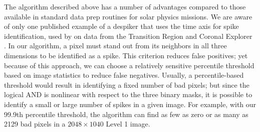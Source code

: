 The algorithm described above has a number of advantages compared to those available in standard data prep routines for solar physics missions. We are aware of only one published example of a despiker that uses the time axis for spike identification, used by \citet{Aschwanden2000(trace_unspike_time)} on data from the Transition Region and Coronal Explorer \citep[TRACE]{handy1999}. In our algorithm, a pixel must stand out from its neighbors in all three dimensions to be identified as a spike. This criterion reduces false positives; yet because of this approach, we can choose a relatively sensitive percentile threshold based on image statistics to reduce false negatives. Usually, a percentile-based threshold would result in identifying a fixed number of bad pixels; but since the logical AND is nonlinear with respect to the three binary masks, it is possible to identify a small or large number of spikes in a given image. For example, with our 99.9th percentile threshold, the algorithm can find as few as zero or as many as 2129 bad pixels in a $2048\times 1040$ Level 1 image. 